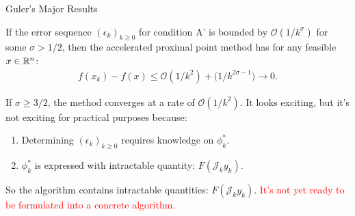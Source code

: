 \documentclass[11pt]{beamer}
\begin{document}
        \begin{frame}{Guler's Major Results}
            \begin{theorem}
                If the error sequence $(\epsilon_k)_{k \ge0}$ for condition A' is bounded by $\mathcal O(1/k^\sigma)$ for some $\sigma > 1/2$, then the accelerated proximal point method has for any feasible $x \in \mathbb R^n$: 
                \begin{align*}
                    f(x_k) - f(x) \le \mathcal O(1/k^2) + \mathcal (1 / k^{2\sigma - 1}) \rightarrow 0. 
                \end{align*}    
            \end{theorem}
            If $\sigma \ge 3/2$, the method converges at a rate of $\mathcal O(1/k^2)$. 
            \pause 
            It looks exciting, but it's not exciting for practical purposes because: 
            \begin{enumerate}
                \item Determining $(\epsilon_k)_{k\ge 0}$ requires knowledge on $\phi_k^*$. 
                \item $\phi_k^*$ is expressed with intractable quantity: $F(\mathcal J_k y_k)$. 
            \end{enumerate}
            So the algorithm contains intractable quantities: $F(\mathcal J_k y_k)$. 
            \textcolor{red}{It's not yet ready to be formulated into a concrete algorithm.}
        \end{frame}
\end{document}
